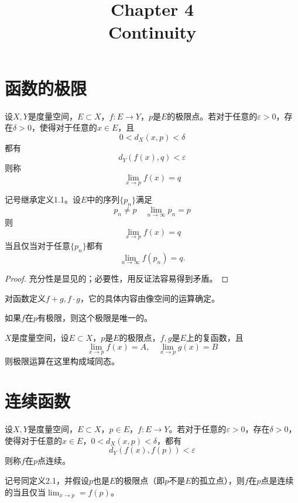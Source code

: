 \documentclass{article}
\title{ {\Huge  \textbf{Chapter 4}} \\Continuity}
\date{}
\newcommand{\ra}{\rightarrow}
\newcommand{\ds}{\displaystyle}
\newcommand{\ve}{\varepsilon}
\begin{document}
\maketitle

\section{函数的极限}
\begin{definition}
    设\(X,Y\)是度量空间，\(E\subset X\)，\(f:E\to Y\)，\(p\)是\(E\)的极限点。若对于任意的\(\varepsilon>0\)，存在\(\delta>0\)，使得对于任意的\(x\in E\)，且\[0<d_X(x,p)<\delta\]都有\[
    d_Y(f(x),q)<\ve
    \]则称\[
    \lim_{x\ra p}f(x) =q
    \]
\end{definition}

\begin{theorem}
    记号继承定义1.1。设\(E\)中的序列\(\{p_n\}\)满足\[
    p_n\neq p\quad \lim_{n\ra \infty }p_n =p
    \] 则\[
    \lim_{x\ra p}f(x) =q
    \]当且仅当对于任意\(\{p_n\}\)都有\[
    \lim_{n\ra \infty}f(p_n) =q.
    \]
\end{theorem}

\begin{proof}
    充分性是显见的；必要性，用反证法容易得到矛盾。
\end{proof}
\begin{definition}
    对函数定义\(f+g,f\cdot g\)，它的具体内容由像空间的运算确定。
\end{definition}
\begin{corollary}
    如果\(f\)在\(p\)有极限，则这个极限是唯一的。
\end{corollary}


\begin{theorem}
    \(X\)是度量空间，设\(E\subset X\)，\(p\)是\(E\)的极限点，\(f,g\)是\(E\)上的复函数，且\[
    \lim_{x\ra p} f(x) =A,\quad \lim_{x\ra p}g(x) =B
    \]则极限运算在这里构成域同态。
\end{theorem}

\section{连续函数}
\begin{definition}
    设\(X,Y\)是度量空间，\(E\subset X\)，\(p\in E\)，\(f:E\to Y\)。若对于任意的\(\ve>0\)，存在\(\delta>0\)，使得对于任意的\(x\in E\)，\(0<d_X(x,p)<\delta\)，都有\[
    d_Y(f(x),f(p))<\ve
    \]则称\(f\)在\(p\)点连续。
\end{definition}

\begin{theorem}
    记号同定义2.1，并假设\(p\)也是\(E\)的极限点（即\(p\)不是\(E\)的孤立点），则\(f\)在\(p\)点是连续的当且仅当\(\ds \lim_{x\ra p} =f(p)\)。
\end{theorem}
\end{document}
